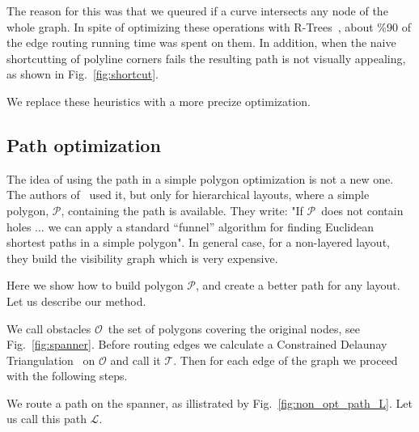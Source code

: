 \documentclass{gd-llncs}
\newcommand{\unpath}{$\mathcal{L}$}
\newcommand{\plg}{$\mathcal{P}$}
\begin{document}
The reason for this was that we queured if a curve intersects any node of the whole graph. In spite of optimizing these operations with R-Trees~\cite{guttman1984r}, about \%90 of the edge routing running time was spent on them. In addition, when the naive shortcutting of polyline corners fails the resulting path is not visually appealing, as shown in Fig.~\ref{fig:shortcut}.

We replace these heuristics with a more precize optimization.
\subsection*{Path optimization} {
The idea of using the path in a simple polygon optimization is not a new one. The authors of~\cite{dobkin1997implementing} used it, but only for hierarchical layouts, where a simple polygon, \plg, containing the path is available. They write: "If \plg~does not contain holes ... we can apply a standard “funnel” algorithm \cite{chazelle1982theorem,hershberger1994computing} for finding Euclidean shortest paths in a simple polygon". In general case, for a non-layered layout, they build the visibility graph which is very expensive.

Here we show how to build polygon \plg, and create a better path for any layout. Let us describe our method.

We call obstacles $\mathcal{O}$~the set of polygons covering the original nodes, see Fig.~\ref{fig:spanner}. Before routing edges we calculate a Constrained Delaunay Triangulation~\cite{delaunay1934sphere} on $\mathcal{O}$ and call it $\mathcal{T}$. Then for each edge of the graph we proceed with the following steps.

We route a path on the spanner, as illistrated by Fig.~\ref{fig:non_opt_path_L}. Let us call this path \unpath.


}
\end{document}
